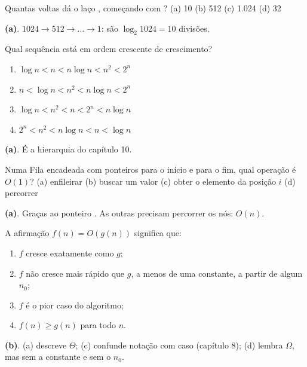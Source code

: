 Quantas voltas dá o laço , começando com ?
\quad (a) 10 \quad (b) 512 \quad (c) 1.024 \quad (d) 32
\begin{resolucao}
\textbf{(a)}. $1024 \to 512 \to \dots \to 1$: são $\log_2 1024 = 10$ divisões.
\end{resolucao}

Qual sequência está em ordem crescente de crescimento?
\begin{enumerate}[label=(\alph*), leftmargin=2em]
  \item $\log n < n < n \log n < n^2 < 2^n$
  \item $n < \log n < n^2 < n \log n < 2^n$
  \item $\log n < n^2 < n < 2^n < n \log n$
  \item $2^n < n^2 < n \log n < n < \log n$
\end{enumerate}
\begin{resolucao}
\textbf{(a)}. É a hierarquia do capítulo 10.
\end{resolucao}

Numa Fila encadeada com ponteiros para o início e para o fim, qual operação é $O(1)$?
\quad (a) enfileirar \quad (b) buscar um valor \quad (c) obter o elemento da posição $i$ \quad (d) percorrer
\begin{resolucao}
\textbf{(a)}. Graças ao ponteiro . As outras precisam percorrer os nós: $O(n)$.
\end{resolucao}

A afirmação $f(n) = O(g(n))$ significa que:
\begin{enumerate}[label=(\alph*), leftmargin=2em]
  \item $f$ cresce exatamente como $g$;
  \item $f$ não cresce mais rápido que $g$, a menos de uma constante, a partir de algum $n_0$;
  \item $f$ é o pior caso do algoritmo;
  \item $f(n) \ge g(n)$ para todo $n$.
\end{enumerate}
\begin{resolucao}
\textbf{(b)}. (a) descreve $\Theta$; (c) confunde notação com caso (capítulo 8); (d) lembra $\Omega$,
mas sem a constante e sem o $n_0$.
\end{resolucao}

